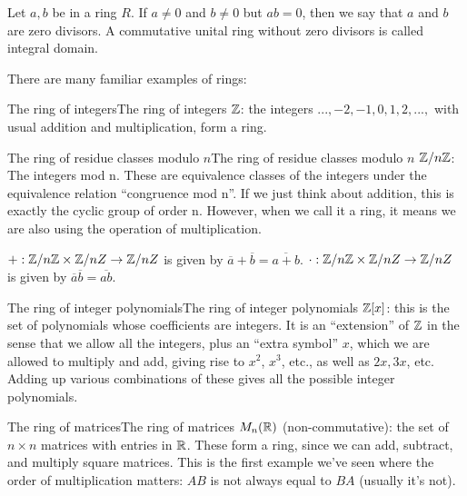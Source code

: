 \begin{definition}{}{}
    Let $a, b$ be in a ring $R$. If $a\neq 0$ and $b\neq0$ but $ab = 0$, then
we say that $a$ and $b$ are zero divisors. A commutative unital ring without zero divisors is called integral domain.  
\end{definition}

There are many familiar examples of rings:
\begin{example}{The ring of integers}{The ring of integers}
    $\mathbb{Z}$: the integers $... , -2, -1, 0, 1, 2, ...,$ with usual addition and multiplication, form a ring.
\end{example}

\begin{example}{The ring of residue classes modulo $n$}{The ring of residue classes modulo $n$}
    $\mathbb{Z}/n\mathbb{Z}$: The integers mod n. These are equivalence classes of the integers under the equivalence
relation “congruence mod n”. If we just think about addition, this is exactly the
cyclic group of order n. However, when we call it a ring, it means
we are also using the operation of multiplication.
\end{example}

$+: \mathbb{Z}/n\mathbb{Z} \times \mathbb{Z}/nZ\rightarrow \mathbb{Z}/nZ$ is given by $\overline{a}+\overline{b}=\overline{a+b}$. 
$\cdot: \mathbb{Z}/n\mathbb{Z} \times \mathbb{Z}/nZ\rightarrow \mathbb{Z}/nZ$ is given by $\overline{a}\overline{b}=\overline{ab}$.

\begin{example}{The ring of integer polynomials}{The ring of integer polynomials}
    $\mathbb{Z}[x]$: this is the set of polynomials whose coefficients are integers. It is an “extension” of $\mathbb{Z}$ in the
sense that we allow all the integers, plus an “extra symbol” $x$, which we are allowed to multiply
and add, giving rise to $x^2$, $x^3$, etc., as well as $2x, 3x$, etc.
Adding up various combinations of these gives all the possible integer polynomials.
\end{example}

\begin{example}{The ring of matrices}{The ring of matrices}
    $M_n(\mathbb{R})$ (non-commutative): the set of $n \times n$ matrices with entries in $\mathbb{R}$. These form a ring, since
we can add, subtract, and multiply square matrices. This is the first example we've seen where
the order of multiplication matters: $AB$ is not always equal to $BA$ (usually it's not).
\end{example}


